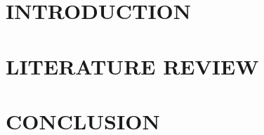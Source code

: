 \documentclass[a4paper,12pt]{report}
\begin{document}
\chapter{INTRODUCTION}

\chapter{LITERATURE REVIEW}

%
%
%
%
%
\chapter{CONCLUSION}


	
	
	
\end{document}
